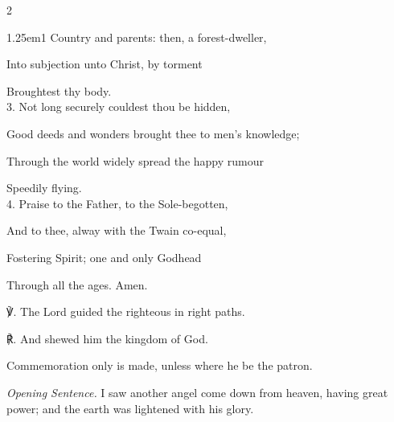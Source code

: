 \begin{paracol}{2}
\begin{hangparas}{1.25em}{1}
Country and parents: then, a forest-dweller,

Into subjection unto Christ, by torment

Broughtest thy body.\\

3. Not long securely couldest thou be hidden,

Good deeds and wonders brought thee to men's knowledge;

Through the world widely spread the happy rumour

Speedily flying.\\

4. Praise to the Father, to the Sole-begotten,

And to thee, alway with the Twain co-equal,

Fostering Spirit; one and only Godhead

Through all the ages. Amen.\\
\end{hangparas}

    ℣. The Lord guided the righteous in right paths.

	℟. And shewed him the kingdom of God.
	


	\fussy
\end{paracol}




\begin{rubric}
	Commemoration only is made, unless where he be the patron.
\end{rubric}

\par\noindent
\textit{Opening Sentence.} I saw another angel come down from heaven, having great power; and the earth was lightened with his glory.

